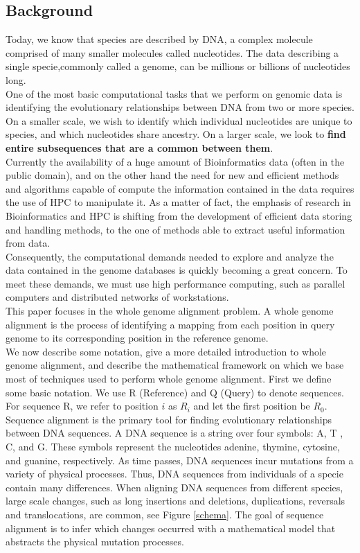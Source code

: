 \documentclass[10pt]{bmc_article}
\newenvironment{bmcformat}{\begin{raggedright}\baselineskip20pt\sloppy\setboolean{publ}{false}}{\end{raggedright}\baselineskip20pt\sloppy}
\begin{document}
\begin{bmcformat}
\section*{Background}
Today, we know that species are described by DNA, a complex molecule comprised of many smaller molecules called nucleotides. The data describing a single specie,commonly called a genome, can be millions or billions of nucleotides long.\\
One of the most basic computational tasks that we perform on genomic data is identifying the evolutionary relationships between DNA from two or more species. On a smaller scale, we wish to identify which individual nucleotides are unique to species, and which nucleotides share ancestry. On a larger scale, we look to \textbf{find entire subsequences that are a common between them}.\\
Currently the availability of a huge amount of  Bioinformatics data (often in the public domain), and on the other hand the  need for new and efficient methods and algorithms capable of  compute the information contained in the data requires the use of HPC to manipulate it. As a matter of fact, the  emphasis of research in Bioinformatics and HPC is shifting from the development of efficient data storing and handling methods, to the one of methods able to  extract useful information from data.\\
Consequently, the computational demands needed to explore and analyze the data contained in the genome databases is quickly becoming a great concern. To meet these demands, we must use high performance computing, such as parallel computers and distributed networks of workstations.\\
This paper focuses in the whole genome alignment problem. A whole genome alignment is the process of identifying a mapping from each position in query genome to its corresponding position in the reference genome.\\ 
We now describe some notation, give a more detailed introduction to whole genome alignment, and describe the mathematical framework on which we base most of techniques used to perform whole genome alignment. First we define some basic notation. We use R (Reference) and Q (Query) to denote sequences. For sequence R, we refer to position $i$ as $R_{i}$ and let the first position be $R_{0}$.\\
Sequence alignment is the primary tool for finding evolutionary relationships between DNA sequences. A DNA sequence is a string over four symbols: A, T , C, and G. These symbols represent the nucleotides adenine, thymine, cytosine, and guanine, respectively. As time passes, DNA sequences incur mutations from a variety of physical processes. Thus, DNA sequences from individuals of a specie contain many differences. When aligning DNA sequences from different species, large scale changes, such as long insertions and deletions, duplications, reversals and translocations, are common, see Figure \ref{schema}. The goal of sequence alignment is to infer which changes occurred with a mathematical model that abstracts the physical mutation processes.\\

\end{bmcformat}
\end{document}
